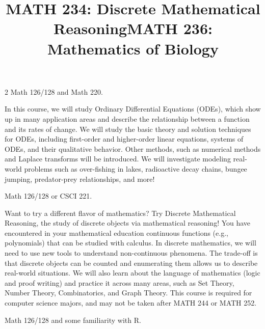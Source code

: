 \documentclass[12pt]{article}
\newcommand{\bolder}{\textbf}
\begin{document}
\begin{multicols}{2}
 Math 126/128 and Math 220.

In this course, we will study Ordinary Differential Equations (ODEs), which show up in many application areas and describe the relationship between a function and its rates of change. We will study the basic theory and solution techniques for ODEs, including first-order and higher-order linear equations, systems of ODEs, and their qualitative behavior. Other methods, such as numerical methods and Laplace transforms will be introduced. We will investigate modeling real-world problems such as over-fishing in lakes, radioactive decay chains, bungee jumping, predator-prey relationships, and more! 


\begin{tcolorbox}[colback=white, colframe=black]
    \begin{center}
    \title{{\large \bolder{MATH 234: Discrete Mathematical Reasoning}}}
    \end{center}
\end{tcolorbox}

 Math 126/128 or CSCI 221.

Want to try a different flavor of mathematics? Try Discrete Mathematical Reasoning, the study of discrete objects via mathematical reasoning! You have encountered in your mathematical education continuous functions (e.g., polynomials) that can be studied with calculus. In discrete mathematics, we will need to use new tools to understand non-continuous phenomena. The trade-off is that discrete objects can be counted and enumerating them allows us to describe real-world situations. We will also learn about the language of mathematics (logic and proof writing) and practice it across many areas, such as Set Theory, Number Theory, Combinatorics, and Graph Theory. This course is required for computer science majors, and may not be taken after MATH 244 or MATH 252.


\begin{tcolorbox}[colback=white, colframe=black]
    \begin{center}
    \title{{\large \bolder{MATH 236: Mathematics of Biology}}}
    \end{center}
\end{tcolorbox}

 Math 126/128 and some familiarity with R.


\end{multicols}
\end{document}
